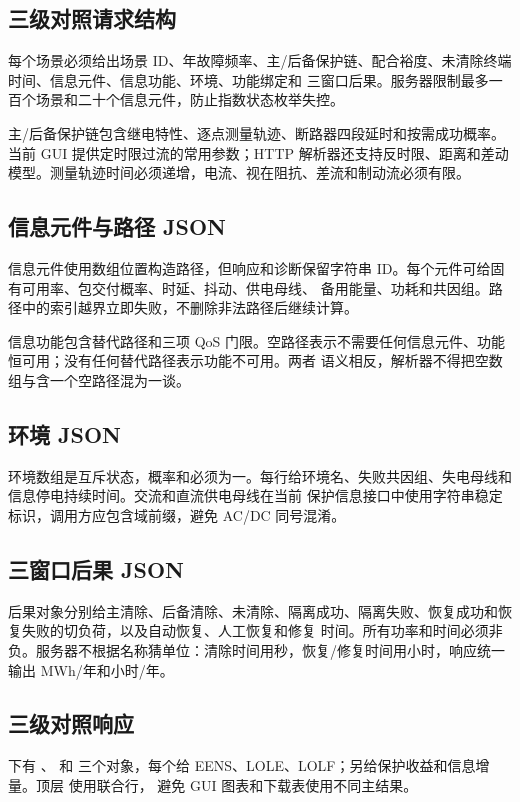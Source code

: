 \subsection{三级对照请求结构}
每个场景必须给出场景 ID、年故障频率、主/后备保护链、配合裕度、未清除终端时间、信息元件、信息功能、环境、功能绑定和
三窗口后果。服务器限制最多一百个场景和二十个信息元件，防止指数状态枚举失控。

主/后备保护链包含继电特性、逐点测量轨迹、断路器四段延时和按需成功概率。当前 GUI 提供定时限过流的常用参数；HTTP
解析器还支持反时限、距离和差动模型。测量轨迹时间必须递增，电流、视在阻抗、差流和制动流必须有限。

\subsection{信息元件与路径 JSON}
信息元件使用数组位置构造路径，但响应和诊断保留字符串 ID。每个元件可给固有可用率、包交付概率、时延、抖动、供电母线、
备用能量、功耗和共因组。路径中的索引越界立即失败，不删除非法路径后继续计算。

信息功能包含替代路径和三项 QoS 门限。空路径表示不需要任何信息元件、功能恒可用；没有任何替代路径表示功能不可用。两者
语义相反，解析器不得把空数组与含一个空路径混为一谈。

\subsection{环境 JSON}
环境数组是互斥状态，概率和必须为一。每行给环境名、失败共因组、失电母线和信息停电持续时间。交流和直流供电母线在当前
保护信息接口中使用字符串稳定标识，调用方应包含域前缀，避免 AC/DC 同号混淆。

\subsection{三窗口后果 JSON}
后果对象分别给主清除、后备清除、未清除、隔离成功、隔离失败、恢复成功和恢复失败的切负荷，以及自动恢复、人工恢复和修复
时间。所有功率和时间必须非负。服务器不根据名称猜单位：清除时间用秒，恢复/修复时间用小时，响应统一输出 MWh/年和小时/年。

\subsection{三级对照响应}
 下有 、 和
 三个对象，每个给 EENS、LOLE、LOLF；另给保护收益和信息增量。顶层  使用联合行，
避免 GUI 图表和下载表使用不同主结果。

